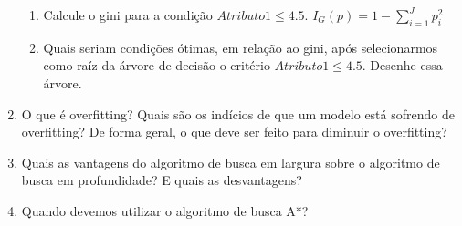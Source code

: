 \documentclass{article}
\begin{document}
\begin{enumerate}
\begin{enumerate}
    \item Calcule o gini para a condição $Atributo1 \leq 4.5$. $I_{G}(p) = 1 - \sum_{i=1}^{J} p_{i}^{2}$
    \item Quais seriam condições ótimas, em relação ao gini, após selecionarmos como raíz da árvore de decisão o critério $Atributo1 \leq 4.5$. Desenhe essa árvore.
\end{enumerate}

\item O que é overfitting? Quais são os indícios de que um modelo está sofrendo de overfitting? De forma geral, o que deve ser feito para diminuir o overfitting?

\item Quais as vantagens do algoritmo de busca em largura sobre o algoritmo de busca em profundidade? E quais as desvantagens?

\item Quando devemos utilizar o algoritmo de busca A*?


\end{enumerate}
\end{document}
